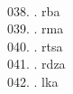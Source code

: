 \begin{tabbing}
\egroup  \\
038.	. 	\> rba 	\> \bgroup\tibetan \def\u#1{\vtop{\baselineskip0pt\hbox{#1}\hbox{\tibsp\char123}}}\parindent=0pt \newbox\fillerbox\setbox\fillerbox\hbox{\vrule height0.4cm depth0.4cm width0pt}\def\filler{\copy\fillerbox}\filler\tibsp{}\tenrm\ \tibetan
\egroup  \\
039.	. 	\> rma 	\> \bgroup\tibetan \def\u#1{\vtop{\baselineskip0pt\hbox{#1}\hbox{\tibsp\char123}}}\parindent=0pt \newbox\fillerbox\setbox\fillerbox\hbox{\vrule height0.4cm depth0.4cm width0pt}\def\filler{\copy\fillerbox}\filler\tibsp{}\tenrm\ \tibetan
\egroup  \\
040.	. 	\> rtsa 	\> \bgroup\tibetan \def\u#1{\vtop{\baselineskip0pt\hbox{#1}\hbox{\tibsp\char123}}}\parindent=0pt \newbox\fillerbox\setbox\fillerbox\hbox{\vrule height0.4cm depth0.4cm width0pt}\def\filler{\copy\fillerbox}\filler\tibsp{}\tenrm\ \tibetan
\egroup  \\
041.	. 	\> rdza 	\> \bgroup\tibetan \def\u#1{\vtop{\baselineskip0pt\hbox{#1}\hbox{\tibsp\char123}}}\parindent=0pt \newbox\fillerbox\setbox\fillerbox\hbox{\vrule height0.4cm depth0.4cm width0pt}\def\filler{\copy\fillerbox}\filler\tibsp{}\tenrm\ \tibetan
\egroup  \\
042.	. 	\> lka 	\> \bgroup\tibetan \def\u#1{\vtop{\baselineskip0pt\hbox{#1}\hbox{\tibsp\char123}}}\parindent=0pt \newbox\fillerbox\setbox\fillerbox\hbox{\vrule height0.4cm depth0.4cm width0pt}\def\filler{\copy\fillerbox}\filler\tibsp{}\tenrm\ \tibetan
\egroup  \\
\end{tabbing}
